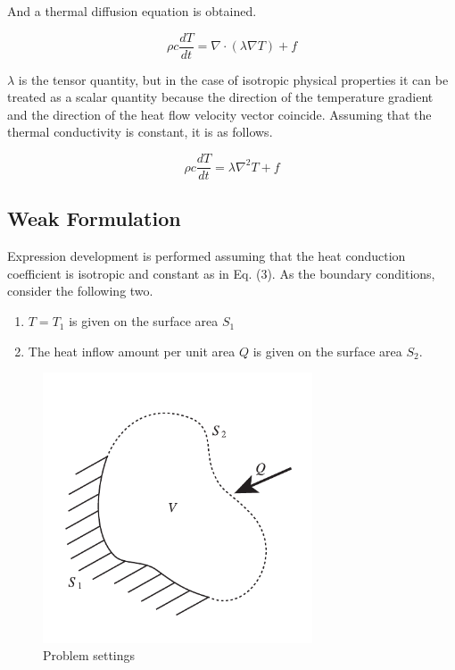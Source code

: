 And a thermal diffusion equation is obtained.

\begin{tcolorbox}[title=Thermal Diffusion Equation]
\begin{equation}
\rho c \frac{dT}{dt} = \nabla\cdot(\lambda\nabla T) + f
\end{equation}
\end{tcolorbox}

$\lambda$ is the tensor quantity, but in the case of isotropic physical properties it can be treated as a scalar quantity because the direction of the temperature gradient and the direction of the heat flow velocity vector coincide. Assuming that the thermal conductivity is constant, it is as follows.

\begin{tcolorbox}[title=Thermal diffusion equation (constant thermal conductivity isotropic)]
\begin{equation}
\rho c \frac{dT}{dt} = \lambda \nabla^2 T + f
\end{equation}
\end{tcolorbox}





\subsection{Weak Formulation}
Expression development is performed assuming that the heat conduction coefficient is isotropic and constant as in Eq. (3).
%
As the boundary conditions, consider the following two.
%
\begin{enumerate}
\item $T=T_1$ is given on the surface area $S_1$
\item The heat inflow amount per unit area $Q$ is given on the surface area $S_2$.
\end{enumerate}

\begin{figure}[hbtp!]
\center
\includegraphics[width=80mm]{images/heat_domain}
\caption{Problem settings}
\end{figure}


